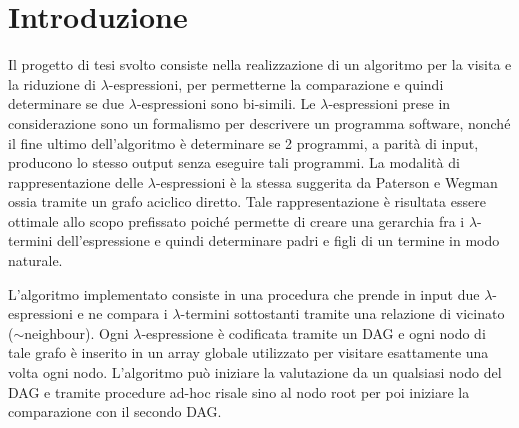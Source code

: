 \documentclass[12pt,a4paper,openright,twoside]{report}
\begin{document}
\clearpage{\pagestyle{empty}\cleardoublepage}
\tableofcontents                        %
\rhead[\fancyplain{}{\bfseries\leftmark}]{\fancyplain{}{\bfseries\thepage}}
\clearpage{\pagestyle{empty}\cleardoublepage}
\chapter{Introduzione}                %
\lhead[\fancyplain{}{\bfseries\thepage}]{\fancyplain{}{\bfseries\rightmark}}
Il progetto di tesi svolto consiste nella realizzazione di un algoritmo per la visita e la riduzione di $\lambda$-espressioni, per permetterne la comparazione e quindi determinare se due $\lambda$-espressioni sono bi-simili.\newline
Le $\lambda$-espressioni prese in considerazione sono un formalismo per descrivere un programma software, nonch\'e il fine ultimo dell'algoritmo \`e determinare se 2 programmi, a parit\`a di input, producono lo stesso output senza eseguire tali programmi.\newline
La modalit\`a di rappresentazione delle $\lambda$-espressioni \`e la stessa suggerita da Paterson e Wegman ossia tramite un grafo aciclico diretto. Tale rappresentazione \`e risultata essere ottimale allo scopo prefissato poich\'e  permette di creare una gerarchia fra i $\lambda$-termini dell'espressione e quindi determinare padri e figli di un termine in modo naturale.\newline

L'algoritmo implementato consiste in una procedura che prende in input due $\lambda$-espressioni e ne compara i $\lambda$-termini sottostanti tramite una relazione di vicinato ($\sim$neighbour).\newline
Ogni $\lambda$-espressione \`e codificata tramite un DAG e ogni nodo di tale grafo \`e inserito in un array globale utilizzato per visitare esattamente una volta ogni nodo. L'algoritmo pu\`o iniziare la valutazione da un qualsiasi nodo del DAG e tramite procedure ad-hoc risale sino al nodo root per poi iniziare la comparazione con il secondo DAG.\newline
\end{document}

